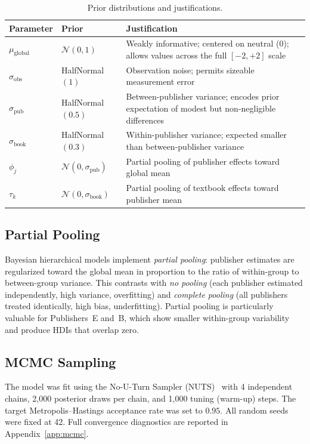 \documentclass[10pt,letterpaper]{article}
\begin{document}
\begin{table}[h]
\centering
\caption{Prior distributions and justifications.}
\label{tab:priors}
\begin{tabular}{llp{6cm}}
\toprule
\textbf{Parameter} & \textbf{Prior} & \textbf{Justification} \\
\midrule
$\mu_{\text{global}}$ & $\mathcal{N}(0, 1)$
  & Weakly informative; centered on neutral ($0$); allows values across the full
    $[-2,+2]$ scale \\
$\sigma_{\text{obs}}$ & HalfNormal$(1)$
  & Observation noise; permits sizeable measurement error \\
$\sigma_{\text{pub}}$ & HalfNormal$(0.5)$
  & Between-publisher variance; encodes prior expectation of modest but
    non-negligible differences \\
$\sigma_{\text{book}}$ & HalfNormal$(0.3)$
  & Within-publisher variance; expected smaller than between-publisher variance \\
$\phi_j$ & $\mathcal{N}(0, \sigma_{\text{pub}})$
  & Partial pooling of publisher effects toward global mean \\
$\tau_k$ & $\mathcal{N}(0, \sigma_{\text{book}})$
  & Partial pooling of textbook effects toward publisher mean \\
\bottomrule
\end{tabular}
\end{table}

\subsection{Partial Pooling}

Bayesian hierarchical models implement \emph{partial pooling}: publisher estimates
are regularized toward the global mean in proportion to the ratio of within-group
to between-group variance.  This contrasts with \emph{no pooling} (each publisher
estimated independently, high variance, overfitting) and \emph{complete pooling}
(all publishers treated identically, high bias, underfitting).  Partial pooling
is particularly valuable for Publishers~E and~B, which show smaller within-group
variability and produce HDIs that overlap zero.

\subsection{MCMC Sampling}

The model was fit using the No-U-Turn Sampler (NUTS)~\citep{abril2023pymc} with
4 independent chains, 2,000 posterior draws per chain, and 1,000 tuning (warm-up)
steps.  The target Metropolis--Hastings acceptance rate was set to $0.95$.  All
random seeds were fixed at 42.  Full convergence diagnostics are reported in
Appendix~\ref{app:mcmc}.
\end{document}
